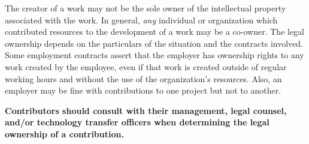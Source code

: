 \documentclass[12pt]{article}
\begin{document}
The creator of a work may not be the sole owner of the
intellectual property associated with the work.
In general, \textit{any} individual or organization which
contributed resources to the development of a work may be a co-owner.
The legal ownership depends on the particulars of the situation and the
contracts involved.
Some employment contracts assert that the employer has
ownership rights to any work created by the employee, even if that work is
created outside
of regular working hours and without the use of the organization's resources.
Also, an employer may be fine with contributions to one project but not to
another.

\bgroup\bfseries
Contributors should consult with their management, legal counsel,
and/or technology transfer officers when determining the legal ownership
of a contribution. 
\egroup
\end{document}
